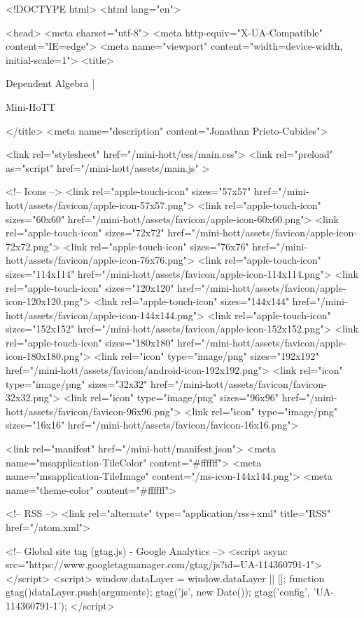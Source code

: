 <!DOCTYPE html>
<html lang="en">

<head>
  <meta charset="utf-8">
  <meta http-equiv="X-UA-Compatible" content="IE=edge">
  <meta name="viewport" content="width=device-width, initial-scale=1">
  <title>
    
      
        Dependent Algebra |
      
        Mini-HoTT
    
  </title>
  <meta name="description" content="Jonathan Prieto-Cubides">

  <link rel="stylesheet" href="/mini-hott/css/main.css">
  <link rel="preload" as="script" href="/mini-hott/assets/main.js" >

  <!-- Icons -->
  <link rel="apple-touch-icon" sizes="57x57" href="/mini-hott/assets/favicon/apple-icon-57x57.png">
  <link rel="apple-touch-icon" sizes="60x60" href="/mini-hott/assets/favicon/apple-icon-60x60.png">
  <link rel="apple-touch-icon" sizes="72x72" href="/mini-hott/assets/favicon/apple-icon-72x72.png">
  <link rel="apple-touch-icon" sizes="76x76" href="/mini-hott/assets/favicon/apple-icon-76x76.png">
  <link rel="apple-touch-icon" sizes="114x114" href="/mini-hott/assets/favicon/apple-icon-114x114.png">
  <link rel="apple-touch-icon" sizes="120x120" href="/mini-hott/assets/favicon/apple-icon-120x120.png">
  <link rel="apple-touch-icon" sizes="144x144" href="/mini-hott/assets/favicon/apple-icon-144x144.png">
  <link rel="apple-touch-icon" sizes="152x152" href="/mini-hott/assets/favicon/apple-icon-152x152.png">
  <link rel="apple-touch-icon" sizes="180x180" href="/mini-hott/assets/favicon/apple-icon-180x180.png">
  <link rel="icon" type="image/png" sizes="192x192"  href="/mini-hott/assets/favicon/android-icon-192x192.png">
  <link rel="icon" type="image/png" sizes="32x32" href="/mini-hott/assets/favicon/favicon-32x32.png">
  <link rel="icon" type="image/png" sizes="96x96" href="/mini-hott/assets/favicon/favicon-96x96.png">
  <link rel="icon" type="image/png" sizes="16x16" href="/mini-hott/assets/favicon/favicon-16x16.png">

  <link rel="manifest" href="/mini-hott/manifest.json">
  <meta name="msapplication-TileColor" content="#ffffff">
  <meta name="msapplication-TileImage" content="/ms-icon-144x144.png">
  <meta name="theme-color" content="#ffffff">

  <!-- RSS -->
  <link rel="alternate" type="application/rss+xml" title="RSS" href="/atom.xml">

  <!-- Global site tag (gtag.js) - Google Analytics -->
  <script async src="https://www.googletagmanager.com/gtag/js?id=UA-114360791-1"></script>
  <script>
    window.dataLayer = window.dataLayer || [];
    function gtag(){dataLayer.push(arguments);}
    gtag('js', new Date());
    gtag('config', 'UA-114360791-1');
  </script>

